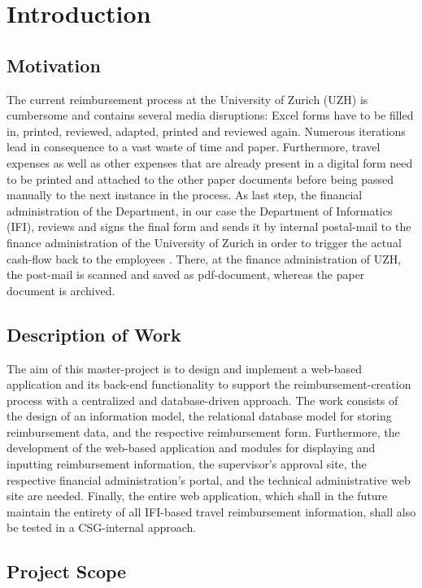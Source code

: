 \chapter{Introduction}

\section{Motivation}

The current reimbursement process at the University of Zurich (UZH) is cumbersome and contains several media disruptions: Excel forms have to be filled in, printed, reviewed, adapted, printed and reviewed again. Numerous iterations lead in consequence to a vast waste of time and paper. Furthermore, travel expenses as well as other expenses that are already present in a digital form need to be printed and attached to the other paper documents before being passed manually to the next instance in the process. As last step, the financial administration of the Department, in our case the Department of Informatics (IFI), reviews and signs the final form and sends it by internal postal-mail to the finance administration of the University of Zurich in order to trigger the actual cash-flow back to the employees \cite{ifi}. There, at the finance administration of UZH, the post-mail is scanned and saved as pdf-document, whereas the paper document is archived.

\section{Description of Work}

The aim of this master-project is to design and implement a web-based application and its back-end functionality to support the reimbursement-creation process with a centralized and database-driven approach. The work consists of the design of an information model, the relational database model for storing reimbursement data, and the respective reimbursement form. Furthermore, the development of the web-based application and modules for displaying and inputting reimbursement information, the supervisor’s approval site, the respective financial administration’s portal, and the technical administrative web site are needed. Finally, the entire web application, which shall in the future maintain the entirety of all IFI-based travel reimbursement information, shall also be tested in a CSG-internal approach.


\section{Project Scope}

